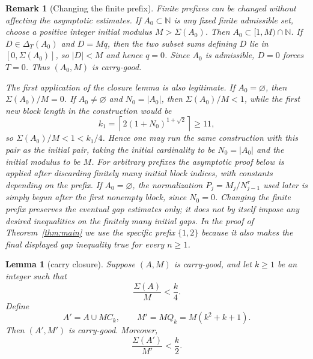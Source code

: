 \documentclass[11pt]{article}
\newtheorem{lemma}{Lemma}
\newtheorem{remark}{Remark}
\newcommand{\N}{\mathbb{N}}
\newcommand{\D}{\Delta}
\newcommand{\Sig}{\Sigma}
\begin{document}
\begin{remark}[Changing the finite prefix]\label{rem:prefix}
Finite prefixes can be changed without affecting the asymptotic estimates.  If $A_0\subset\N$ is any fixed finite admissible set, choose a positive integer initial modulus $M>\Sig(A_0)$.  Then $A_0\subset[1,M)\cap\N$.  If $D\in\D_T(A_0)$ and $D=Mq$, then the two subset sums defining $D$ lie in $[0,\Sig(A_0)]$, so $|D|<M$ and hence $q=0$.  Since $A_0$ is admissible, $D=0$ forces $T=0$.  Thus $(A_0,M)$ is carry-good.

The first application of the closure lemma is also legitimate.  If $A_0=\varnothing$, then $\Sig(A_0)/M=0$.  If $A_0\ne\varnothing$ and $N_0=|A_0|$, then $\Sig(A_0)/M<1$, while the first new block length in the construction would be
\[
        k_1=\left\lceil 2(1+N_0)^{1+\sqrt2}\right\rceil\ge 11,
\]
so $\Sig(A_0)/M<1<k_1/4$.  Hence one may run the same construction with this pair as the initial pair, taking the initial cardinality to be $N_0=|A_0|$ and the initial modulus to be $M$.  For arbitrary prefixes the asymptotic proof below is applied after discarding finitely many initial block indices, with constants depending on the prefix.  If $A_0=\varnothing$, the normalization $P_j=M_j/N_{j-1}^{\tau}$ used later is simply begun after the first nonempty block, since $N_0=0$.  Changing the finite prefix preserves the eventual gap estimates only; it does not by itself impose any desired inequalities on the finitely many initial gaps.  In the proof of Theorem~\ref{thm:main} we use the specific prefix $\{1,2\}$ because it also makes the final displayed gap inequality true for every $n\ge1$.
\end{remark}

\begin{lemma}[carry closure]\label{lem:closure}
Suppose $(A,M)$ is carry-good, and let $k\ge1$ be an integer such that
\[
        \frac{\Sig(A)}M<\frac k4.
\]
Define
\[
        A'=A\cup M C_k,
        \qquad
        M'=M Q_k=M(k^2+k+1).
\]
Then $(A',M')$ is carry-good.  Moreover,
\[
        \frac{\Sig(A')}{M'}<\frac k2.
\]
\end{lemma}
\end{document}
